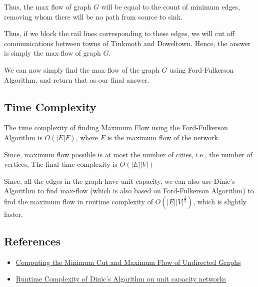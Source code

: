 \documentclass{article}
\begin{document}
Thus, the max flow of graph $G$ will be equal to the count of minimum edges, removing whom there will be no path from source to sink. 

Thus, if we block the rail lines corresponding to these edges, we will cut off communications between towns of Tinkmoth and Doweltown. Hence, the answer is simply the max-flow of graph $G$.

We can now simply find the max-flow of the graph $G$ using Ford-Fulkerson Algorithm, and return that as our final answer.

\subsection{Time Complexity}

The time complexity of finding Maximum Flow using the Ford-Fulkerson Algorithm is $O(|E|F)$, where $F$ is the maximum flow of the network.

Since, maximum flow possible is at most the number of cities, i.e., the number of vertices, The final time complexity is $O(|E||V|)$

Since, all the edges in the graph have unit capacity, we can also use Dinic's Algorithm to find max-flow (which is also based on Ford-Fulkerson Algorithm) to find the maximum flow in runtime complexity of $O(|E||V|^{\frac{2}{3}})$, which is slightly faster.

\subsection{References}

\begin{itemize}
    \item \href{https://www.inf.ufpr.br/pos/techreport/RT_DINF003_2004.pdf}{Computing the Minimum Cut and Maximum
Flow of Undirected Graphs}
    \item 
    \href{https://cp-algorithms.com/graph/dinic.html#unit-capacities-networks}{Runtime Complexity of Dinic's Algorithm on unit capacity networks}
\end{itemize}
\end{document}

